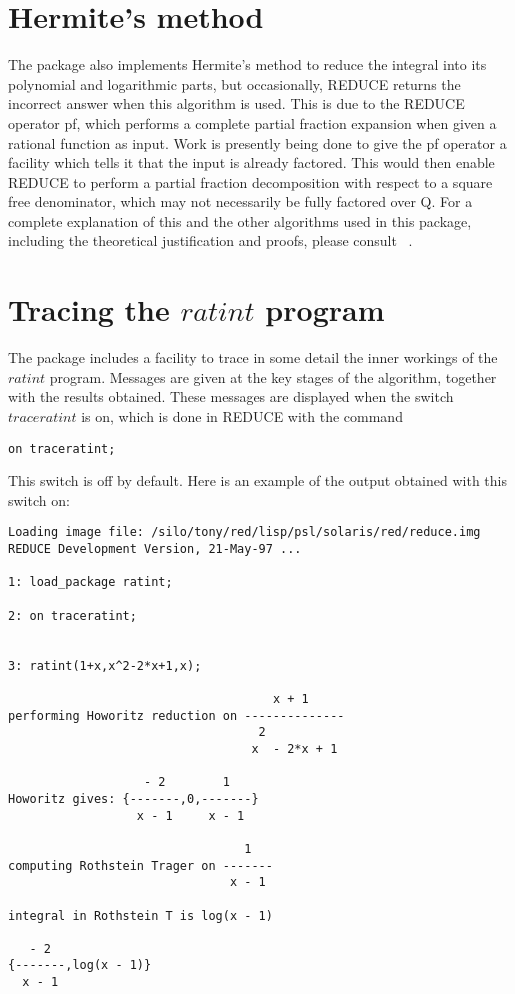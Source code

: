 \section{Hermite's method}
The package also implements Hermite's method to reduce the integral into its polynomial and logarithmic parts, but occasionally, \small{REDUCE} returns the incorrect answer when this algorithm is used. This is due to the REDUCE operator pf, which performs a complete partial fraction expansion when given a rational function as input. Work is presently being done to give the pf operator a facility which tells it that the input is already factored. This would then enable REDUCE to perform a partial fraction decomposition with respect to a square free denominator, which may not necessarily be fully factored over Q. 
\newline
For a complete explanation of this and the other algorithms used in this package, including the theoretical justification and proofs, please consult ~\cite{Ged92}.

\section{Tracing the $ratint$ program}
The package includes a facility to trace in some detail the inner workings of the $ratint$ program. Messages are given at the key stages of the algorithm, together with the results obtained. These messages are displayed when the switch $traceratint$ is on, which is done in \small{REDUCE} \normalsize with the command 
\begin{verbatim}
on traceratint;
\end{verbatim}
This switch is off by default. Here is an example of the output obtained with this switch on:

\begin{verbatim}
Loading image file: /silo/tony/red/lisp/psl/solaris/red/reduce.img
REDUCE Development Version, 21-May-97 ...

1: load_package ratint;

2: on traceratint;


3: ratint(1+x,x^2-2*x+1,x);

                                     x + 1
performing Howoritz reduction on --------------
                                   2
                                  x  - 2*x + 1

                   - 2        1
Howoritz gives: {-------,0,-------}
                  x - 1     x - 1

                                 1
computing Rothstein Trager on -------
                               x - 1

integral in Rothstein T is log(x - 1)

   - 2
{-------,log(x - 1)}
  x - 1

\end{verbatim}

